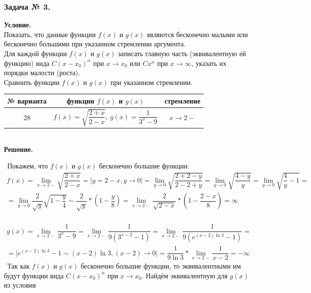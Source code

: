 \documentclass[12pt]{article}
\begin{document}
\subsubsection*{\center Задача № 3.}
{\bf Условие.~}\\
 Показать, что данные функции
$f(x)$ и $g(x)$ являются бесконечно малыми или бесконечно большими
при указанном стремлении аргумента. \\
 Для каждой функции $f(x)$ и $g(x)$ записать главную часть
(эквивалентную ей функцию)  вида $C(x-x_0)^{\alpha}$ при $x\rightarrow x_0$ или $Cx^{\alpha}$
при $x\rightarrow\infty$, указать их порядки малости (роста). \\
 Сравнить функции $f(x)$ и $g(x)$ при указанном стремлении.
\begin{center}
	\begin{tabular}{|c|c|c|}
		\hline
		№ варианта & функции $f(x)$ и $g(x)$ & стремление \\[6pt]
		\hline
		28 & $f(x) = \sqrt{\dfrac{2+x}{2-x}},~g(x)=\dfrac{1}{3^x-9}$ & $x\rightarrow2-$ \\
		\hline
	\end{tabular}
\bigskip
\\
{\bf Решение.~}\\
\end{center}
\medskip
{}~Покажем, что $f(x)$ и $g(x)$ бесконечно большие функции.
\\
$$
\begin{array}{cc}
f(x) = \lim\limits_{x\rightarrow2-}\sqrt{\dfrac{2+x}{2-x}}=\left| y=2-x, y \to 0\right|=\lim\limits_{y\rightarrow0}\sqrt{\dfrac{2+2-y}{2-2+y}}=\lim\limits_{y\rightarrow0}\sqrt{\dfrac{4-y}{y}}=\lim\limits_{y\rightarrow0}\sqrt{\dfrac{4}{y}-1}=\\=\lim\limits_{y\rightarrow0}\dfrac{2}{\sqrt{y}}\sqrt{1-\dfrac{y}{4}}\sim\dfrac{2}{\sqrt{y}}*\left(1-\dfrac{y}{8}\right)=\lim\limits_{x\rightarrow2-}\dfrac{2}{\sqrt{2-x}}*\left(1-\dfrac{2-x}{8}\right)=\infty
\end{array}
$$
\\
$$
\begin{array}{cc}
g(x) = \lim\limits_{x\rightarrow2-}\dfrac{1}{3^x-9}=\lim\limits_{x\rightarrow2-}\dfrac{1}{9(3^{x-2}-1)}=\lim\limits_{x\rightarrow2-}\dfrac{1}{9(e^{(x-2)\ln{3}}-1)}=\\=\biggl| e^{(x-2)\ln{3}}-1 \sim {(x-2)\ln{3}}, {(x-2)} \to 0 \biggl|=\dfrac{1}{9\ln{3}}*\lim\limits_{x\rightarrow2-}\dfrac{1}{x-2}=-\infty
\end{array}
$$
~Так как $f(x)$ и $g(x)$ бесконечно большие функции, то эквивалентными им будут функции вида 
$C{(x-x_{0})^{\alpha}}$ при $x\rightarrow x_{0}$. Найдём эквивалентную для $g(x)$ из условия
\end{document}
